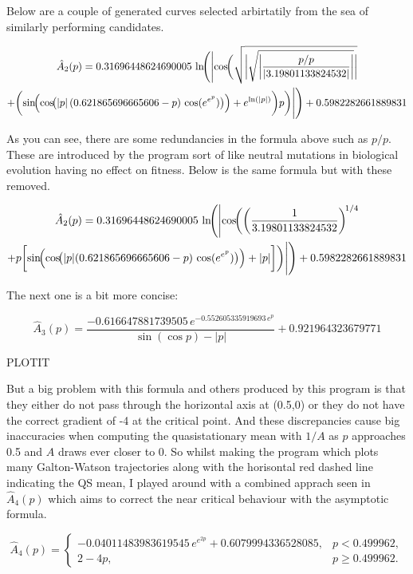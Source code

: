 \documentclass[11pt]{article}
\begin{document}
Below are a couple of generated curves selected arbirtatily from the sea of similarly performing candidates.

\begin{multline*}
\hat A_2(p) = 0.31696448624690005 \,
\ln\!\Biggl(
\Biggl|
\cos\!\biggl(
\sqrt{
\biggl|
\sqrt{
\biggl|
\frac{p/p}{| 3.19801133824532 |}
\biggr|
}
\biggr|
} \\
+
\biggl(
\sin\!\Bigl(
\cos\!\bigl(
|p| \,
(0.621865696665606 - p)\,
\cos(e^{e^{p}})
\bigr)
\Bigr)
+
e^{\ln(|p|)}
\biggr) p
\biggr)
\Biggr|
\Biggr)
+ 0.5982282661889831
\end{multline*}

\noindent
As you can see, there are some redundancies in the formula above such as $p/p$. These are introduced by the program sort of like neutral mutations in biological evolution having no effect on fitness. Below is the same formula but with these removed.

\begin{multline*}
\hat A_2(p) = 0.31696448624690005 \,
\ln\!\Biggl(
\Biggl|
\cos\!\biggl(
\left( \frac{1}{3.19801133824532} \right)^{\!1/4} \\
+
p \biggl[
\sin\!\Bigl(
\cos\!\bigl(
|p| (0.621865696665606 - p)\,
\cos(e^{e^{p}})
\bigr)
\Bigr)
+
|p|
\biggr]
\biggr)
\Biggr|
\Biggr)
+ 0.5982282661889831
\end{multline*}

\noindent
The next one is a bit more concise:

\[
\hat A_3(p)  = \frac{-0.616647881739505 \, e^{-0.552605335919693 \, e^p}}{\sin(\cos p) - |p|} + 0.921964323679771
\]

PLOTIT

\noindent
But a big problem with this formula and others produced by this program is that they either do not pass through the horizontal axis at (0.5,0) or they do not have the correct gradient of -4 at the critical point. And these discrepancies cause big inaccuracies when computing the quasistationary mean with $1/A$ as $p$ approaches 0.5 and $A$ draws ever closer to 0. So whilst making the program which plots many Galton-Watson trajectories along with the horisontal red dashed line indicating the QS mean, I played around with a combined apprach seen in $\hat A_4(p)$ which aims to correct the near critical behaviour with the asymptotic formula. 


\[
\hat A_4(p) = 
\begin{cases}
-0.04011483983619545\, e^{e^{2p}} + 0.6079994336528085, & p < 0.499962,\\[2mm]
2 - 4p, & p \ge 0.499962.
\end{cases}
\]
\end{document}
